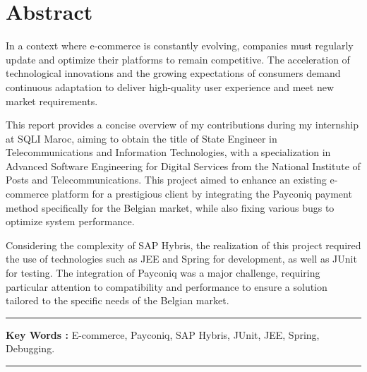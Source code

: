 \chapter*{Abstract}

In a context where e-commerce is constantly evolving, companies must regularly update and optimize their platforms to remain competitive. The acceleration of technological innovations and the growing expectations of consumers demand continuous adaptation to deliver high-quality user experience and meet new market requirements.
\vspace{10pt}

This report provides a concise overview of my contributions during my internship at SQLI Maroc, aiming to obtain the title of State Engineer in Telecommunications and Information Technologies, with a specialization in Advanced Software Engineering for Digital Services from the National Institute of Posts and Telecommunications. This project aimed to enhance an existing e-commerce platform for a prestigious client by integrating the Payconiq payment method specifically for the Belgian market, while also fixing various bugs to optimize system performance.
\vspace{10pt}

Considering the complexity of SAP Hybris, the realization of this project required the use of technologies such as JEE and Spring for development, as well as JUnit for testing. The integration of Payconiq was a major challenge, requiring particular attention to compatibility and performance to ensure a solution tailored to the specific needs of the Belgian market.
\vspace{10pt}

\noindent\rule[2pt]{\textwidth}{0.5pt}

{\textbf{Key Words :}}
E-commerce, Payconiq, SAP Hybris, JUnit, JEE, Spring, Debugging.
\\
\noindent\rule[2pt]{\textwidth}{0.5pt}